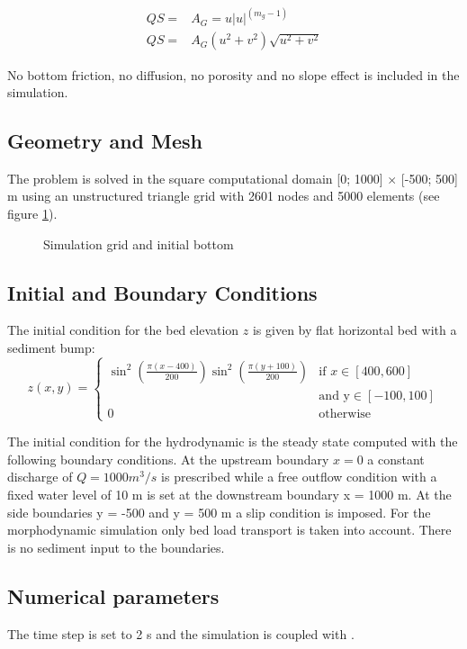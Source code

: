 \begin{equation}
\begin{array}{ll}
     QS = &A_G = u |u|^{(m_g-1)} \\
     QS = & A_G (u^2+v^2)  \sqrt{u^2 + v^2}
\end{array}
\end{equation}


No bottom friction, no diffusion, no porosity and no slope effect is included in the simulation.
%
\subsection{Geometry and Mesh}
%
The problem is solved in the
square computational domain [0; 1000] $\times$ [-500; 500] m using an unstructured triangle grid with 2601 nodes and
5000 elements (see figure \ref{init}).
\begin{figure} [!h] %
\centering
{}
 \caption{Simulation grid and initial bottom}\label{init}
\end{figure}

%
\subsection{Initial and Boundary Conditions}
%
The initial condition for the
bed elevation $z$ is given by flat horizontal bed with a sediment bump:
\begin{equation}
z(x,y) = \left\{
  \begin{array}{lr}
\sin^2 (\frac{\pi (x-400)}{200}) \sin^2 (\frac{\pi (y+100)}{200}) & \text{if } x \in [400, 600] \\
& \text{and y} \in [-100,100] \\
0 & \text{otherwise}
  \end{array}
\right.
\end{equation}

The initial condition for the hydrodynamic is the steady state computed with the following boundary conditions.
At the upstream boundary $x = 0$ a constant discharge of $Q =
1000 m^3/s$ is prescribed while a free outflow condition with a fixed water level of 10 m
is set at the downstream boundary
x = 1000 m. At the side boundaries y = -500 and y = 500 m  a
slip condition is imposed.
For the morphodynamic simulation only bed load transport is taken into account. There is no sediment
input to the boundaries.


%
\subsection{Numerical parameters}
%
The time step is set to 2 s and the simulation is coupled with \gaia{}.


